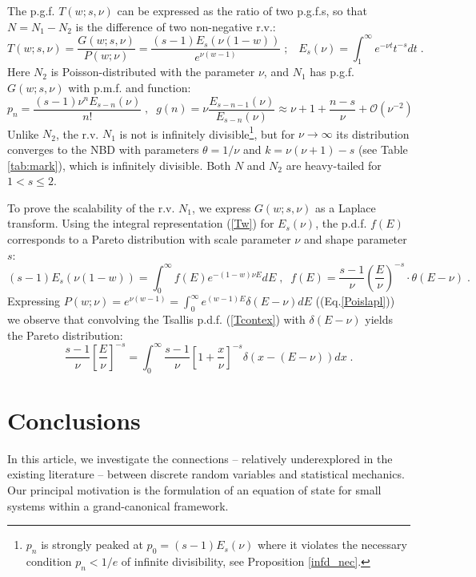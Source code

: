 \documentclass[a4paper,12pt]{amsart}
\theoremstyle{definition}
\theoremstyle{remark}
\begin{document}
 The p.g.f. $T(w;s,\nu)$ can be expressed as the ratio of two p.g.f.{}s, so that $N=N_1-N_2$ is the difference of two non-negative r.v.:
\begin{equation}\label{Tw}
T(w;s,\nu)=\frac{G(w;s,\nu)}{P(w;\nu)}
=\frac{(s-1)E_{s}(\nu(1-w))}{e^{\nu (w-1)} }\;;\;\;\; E_s(\nu)\!=\!\int_1^{\infty} e^{-\nu t}t^{-s}dt\;.
\end{equation}
Here $N_2$ is Poisson-distributed with the parameter $\nu$, and $N_1$ has p.g.f. $G(w;s,\nu)$ with p.m.f. and  function:
\begin{equation}\label{numTsal}
p_n=\frac{(s-1) \nu^n  E_{s-n}(\nu )}{n!}\;,\;\;
g(n)=\nu \frac{E_{s-n-1}(\nu )}{E_{s-n}(\nu )}
\approx \nu +1+\frac{n-s}{\nu }+\mathcal{O}\left(\nu^{-2} \right)
\end{equation}
Unlike $N_2$, the r.v. $N_1$ is not is infinitely divisible\footnote{$p_n$ is strongly peaked at $p_0=(s-1)E_s(\nu)$  where it violates the necessary condition $p_n<1/e$ of infinite divisibility, see Proposition \ref{infd_nec}.}, but for $\nu\to \infty$  its distribution converges  to the NBD with parameters $\theta=1/\nu$ and $k=\nu(\nu+1)-s$ (see Table \ref{tab:mark}), which is infinitely divisible. Both $N$  and $N_2$ are heavy-tailed for $1<s \leq 2$. 
 
To prove the scalability of the r.v. $N_1$, we express  $G(w;s,\nu)$ as a Laplace transform. Using the integral representation (\ref{Tw}) for $E_s(\nu)$, the p.d.f. $f(E)$ corresponds to a Pareto distribution with scale  parameter $\nu$ and shape parameter $s$:
\begin{equation}\label{Pareto2pgf}
(s-1)E_{s}(\nu(1-w))=\int_0^{\infty}f(E)e^{-(1-w)\nu E}dE\;,\;
\;f(E)=\frac{s-1}{\nu}\left(\frac{E}{\nu}\right)^{-s}\cdot \theta(E-\nu)\;.
\end{equation}
Expressing  $P(w;\nu)=e^{\nu (w-1)}=\int_0^{\infty}e^{ (w-1)E}\delta(E-\nu)dE$ ((Eq.\ref{Poislapl})) we observe
that convolving the Tsallis p.d.f. (\ref{Tcontex}) with
$\delta(E-\nu)$ yields the Pareto distribution:
\[
\frac{s-1}{\nu}\left[\frac{E}{\nu}\right]^{-s}=\int_0^{\infty}\frac{s-1}{\nu}\left[1+\frac{x}{\nu}\right]^{-s}\delta(x-(E-\nu))dx\;.
\]

\newpage
\section{Conclusions}
In this article, we investigate the connections -- relatively underexplored in the existing literature -- between discrete random variables and statistical mechanics. Our principal motivation is the formulation of an equation of state for small systems within a grand-canonical framework.
\end{document}
